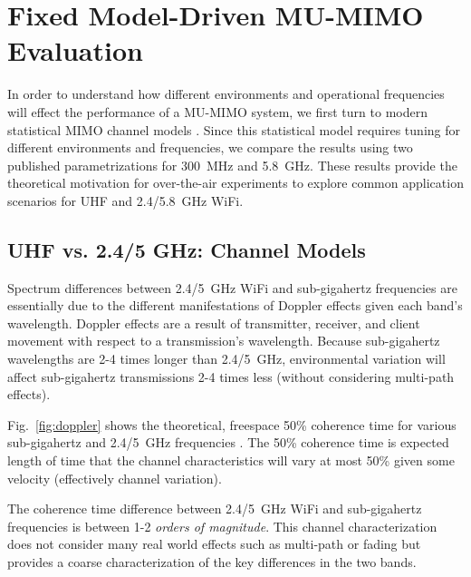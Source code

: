 

\section{Fixed Model-Driven MU-MIMO Evaluation}
\label{sec:model}
In order to understand how different environments and operational frequencies will effect the performance of a \ac{MU-MIMO} system, we first turn to modern statistical MIMO channel models \cite{liu2012cost}.
Since this statistical model requires tuning for different environments and frequencies, we compare the results using two published parametrizations  for 300~MHz \cite{zhu2013cost} and 5.8~GHz\cite{poutanen2011cost}. These results provide the theoretical motivation for over-the-air experiments to explore common application scenarios for UHF and 2.4/5.8~GHz WiFi.

\subsection{UHF vs. 2.4/5 GHz: Channel Models}
\label{sec:specDiff}

	Spectrum differences between 2.4/5~GHz WiFi and sub-gigahertz frequencies are essentially due to the different manifestations of Doppler effects given each band's wavelength.
	Doppler effects are a result of transmitter, receiver, and client movement with respect to a transmission's wavelength.  
	Because sub-gigahertz wavelengths are 2-4 times longer than 2.4/5~GHz, environmental variation will affect sub-gigahertz transmissions 2-4 times less (without considering multi-path effects).  

	Fig.~\ref{fig:doppler} shows the theoretical, freespace 50\% coherence time for various sub-gigahertz and 2.4/5~GHz frequencies \cite{rappaport1996wireless}.
	The 50\% coherence time is expected length of time that the channel characteristics will  vary at most 50\% given some velocity (effectively channel variation).

	The coherence time difference between 2.4/5~GHz WiFi and sub-gigahertz frequencies is between 1-2 \textit{orders of magnitude}.
	This channel characterization does not consider many real world effects such as multi-path or fading but provides a coarse characterization of the key differences in the two bands.

